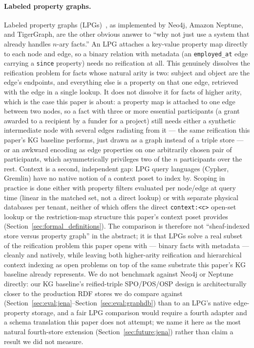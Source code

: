 \paragraph{Labeled property graphs.}
\label{sec:related-work:lpg}
Labeled property graphs (LPGs)~\cite{angles2017property}, as
implemented by Neo4j, Amazon Neptune, and TigerGraph, are the other
obvious answer to ``why not just use a system that already handles
$n$-ary facts.'' An LPG attaches a key-value property map directly to
each node and edge, so a binary relation with metadata (an
\texttt{employed\_at} edge carrying a \texttt{since} property) needs no
reification at all. This genuinely dissolves the reification problem
for facts whose natural arity is two: subject and object are the
edge's endpoints, and everything else is a property on that one edge,
retrieved with the edge in a single lookup. It does not dissolve it for
facts of higher arity, which is the case this paper is about: a
property map is attached to one edge between two nodes, so a fact with
three or more essential participants (a grant awarded to a recipient by
a funder for a project) still needs either a synthetic intermediate
node with several edges radiating from it --- the same reification this
paper's KG baseline performs, just drawn as a graph instead of a triple
store --- or an awkward encoding as edge properties on one arbitrarily
chosen pair of participants, which asymmetrically privileges two of the
$n$ participants over the rest. Context is a second, independent gap:
LPG query languages (Cypher, Gremlin) have no native notion of a
context poset to index by. Scoping in practice is done either with
property filters evaluated per node/edge at query time (linear in the
matched set, not a direct lookup) or with separate physical databases
per tenant, neither of which offers the direct \texttt{context:<c>}
open-set lookup or the restriction-map structure this paper's context
poset provides (Section~\ref{sec:formal_definitions}). The comparison
is therefore not ``sheaf-indexed store versus property graph'' in the
abstract; it is that LPGs solve a real subset of the reification
problem this paper opens with --- binary facts with metadata --- cleanly
and natively, while leaving both higher-arity reification and
hierarchical context indexing as open problems on top of the same
substrate this paper's KG baseline already represents. We do not
benchmark against Neo4j or Neptune directly: our KG baseline's
reified-triple SPO/POS/OSP design is architecturally closer to the
production RDF stores we do compare against
(Section~\ref{sec:eval:jena}--Section~\ref{sec:eval:graphdb}) than to an
LPG's native edge-property storage, and a fair LPG comparison would
require a fourth adapter and a schema translation this paper does not
attempt; we name it here as the most natural fourth-store extension
(Section~\ref{sec:future:jena}) rather than claim a result we did not
measure.

